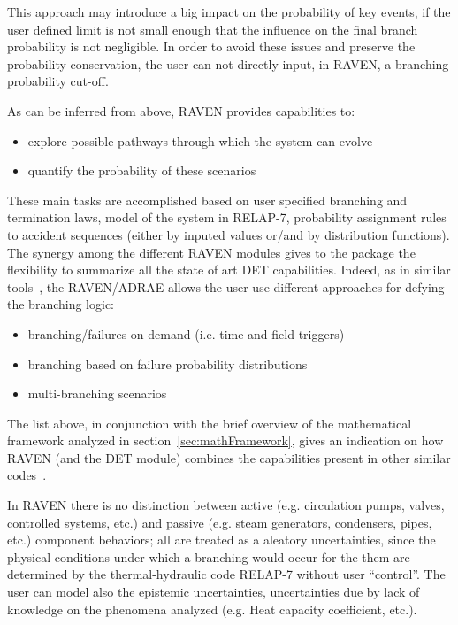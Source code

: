 \documentclass{mc2013}
\begin{document}
This approach may introduce a big impact on the probability of key events, if the user defined limit is not small enough that the influence on the final branch probability is not negligible.  In order to avoid these issues and preserve the probability conservation, the user can not directly input, in RAVEN, a branching probability cut-off. 

As can be inferred from above, RAVEN provides capabilities to:
\vspace{-5mm}
\begin{itemize}
\itemsep0em
\item explore possible pathways through which the system can evolve
\item quantify the probability of these scenarios
\end{itemize}
\vspace{-5mm}
These main tasks are accomplished based on user specified branching and termination laws, model of the system in RELAP-7, probability assignment rules to accident sequences (either by inputed values or/and by distribution functions).
The synergy among the different RAVEN modules gives to the package the flexibility to summarize all the state of art DET capabilities. 
Indeed, as in similar tools~\cite{ADAPTHakobyan}, the RAVEN/ADRAE allows the user use different approaches for defying the branching logic:
\vspace{-5mm}
\begin{itemize}
\itemsep0em
\item branching/failures on demand (i.e. time and field triggers)
\item branching based on failure probability distributions
\item multi-branching scenarios
\end{itemize}
\vspace{-5mm}
The list above, in conjunction with the brief overview of the mathematical framework analyzed in section~\ref{sec:mathFramework}, gives an indication on how RAVEN (and the DET module) combines the capabilities present in other similar codes~\cite{ADAPTHakobyan}.  

In RAVEN there is no distinction between active (e.g. circulation pumps, valves, controlled systems, etc.) and passive (e.g. steam generators, condensers, pipes, etc.) component behaviors; all are treated as a aleatory uncertainties, since the physical conditions under which a branching would occur for the them are determined by the thermal-hydraulic code RELAP-7 without user ``control''. The user can model also the epistemic uncertainties, uncertainties due by lack of knowledge on the phenomena analyzed (e.g. Heat capacity coefficient, etc.). 
\end{document}
